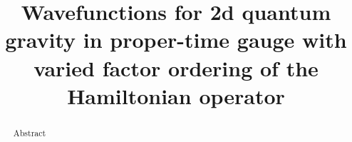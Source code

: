 \documentclass{article}
\begin{document}

\title{Wavefunctions for 2d quantum gravity in proper-time gauge with varied factor ordering of the Hamiltonian operator}
\maketitle

\begin{abstract}
Abstract
\end{abstract}









\end{document}
